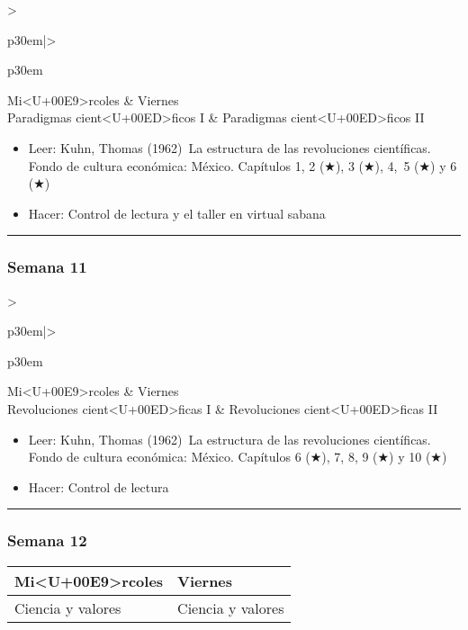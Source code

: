 \documentclass[spanish,]{article}
\begin{document}
\begin{tabular}{>{\raggedright\arraybackslash}p{30em}|>{\raggedright\arraybackslash}p{30em}}
\hline
Mi<U+00E9>rcoles & Viernes\\
\hline
Paradigmas cient<U+00ED>ficos I & Paradigmas cient<U+00ED>ficos II\\
\hline
\end{tabular}

\begin{itemize}
\item
  Leer: Kuhn, Thomas (1962)~La estructura de las revoluciones
  científicas. Fondo de cultura económica: México. Capítulos 1, 2 (★), 3
  (★), 4,~5 (★) y 6 (★)
\item
  Hacer: Control de lectura y el taller en virtual sabana
\end{itemize}

\begin{center}\rule{0.5\linewidth}{\linethickness}\end{center}

\subsubsection{Semana 11}\label{semana-11}

\begin{tabular}{>{\raggedright\arraybackslash}p{30em}|>{\raggedright\arraybackslash}p{30em}}
\hline
Mi<U+00E9>rcoles & Viernes\\
\hline
Revoluciones cient<U+00ED>ficas I & Revoluciones cient<U+00ED>ficas II\\
\hline
\end{tabular}

\begin{itemize}
\item
  Leer: Kuhn, Thomas (1962)~La estructura de las revoluciones
  científicas. Fondo de cultura económica: México. Capítulos 6 (★), 7,
  8, 9 (★) y 10 (★)
\item
  Hacer: Control de lectura
\end{itemize}

\begin{center}\rule{0.5\linewidth}{\linethickness}\end{center}

\subsubsection{Semana 12}\label{semana-12}

\begin{tabular}{>{\raggedright\arraybackslash}p{30em}|>{\raggedright\arraybackslash}p{30em}}
\hline
Mi<U+00E9>rcoles & Viernes\\
\hline
Ciencia y valores & Ciencia y valores\\
\hline
\end{tabular}
\end{document}
